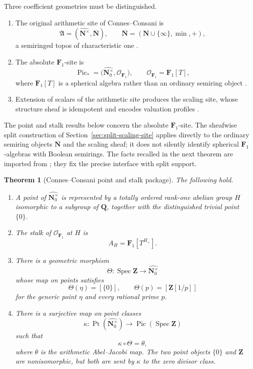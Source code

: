 \documentclass[11pt]{amsart}
\numberwithin{equation}{section}
\newtheorem{theorem}{Theorem}[section]
\theoremstyle{definition}
\newcommand{\Z}{\mathbf Z}
\newcommand{\Q}{\mathbf Q}
\newcommand{\N}{\mathbf N}
\newcommand{\Fone}{\mathbf F_1}
\newcommand{\Spec}{\operatorname{Spec}}
\newcommand{\cO}{\mathcal O}
\newcommand{\Nbar}{\overline{\N}}
\begin{document}
Three coefficient geometries must be distinguished.
\begin{enumerate}[label=\textup{(\roman*)}]
\item The original arithmetic site of Connes--Consani is
\[
\mathfrak A=(\widehat{\N^\times},\Nbar),
\qquad
\Nbar=(\N\cup\{\infty\},\min,+),
\]
a semiringed topos of characteristic one \cite{CCArithmeticSite}.
\item The absolute $\Fone$-site is
\[
\operatorname{Pic}_*
 =\bigl(\widehat{\N_0^\times},\cO_{\Fone}\bigr),
\qquad
\cO_{\Fone}=\Fone[T],
\]
where $\Fone[T]$ is a spherical algebra rather than an ordinary semiring
object \cite{CCAbsolute}.
\item Extension of scalars of the arithmetic site produces the scaling
site, whose structure sheaf is idempotent and encodes valuation profiles
\cite{CCScalingSite}.
\end{enumerate}
The point and stalk results below concern the absolute $\Fone$-site.  The
sheafwise split construction of Section~\ref{sec:split-scaling-site}
applies directly to the ordinary semiring objects $\Nbar$ and the scaling
sheaf; it does not silently identify spherical $\Fone$-algebras with
Boolean semirings.  The facts recalled in the next theorem are imported
from \cite{CCAbsolute,CCArithmeticSite}; they fix the precise interface
with split support.

\begin{theorem}[Connes--Consani point and stalk package]
\label{thm:cc-package}
The following hold.
\begin{enumerate}[label=\textup{(\roman*)}]
\item A point of $\widehat{\N_0^\times}$ is represented by a totally ordered
rank-one abelian group $H$ isomorphic to a subgroup of $\Q$, together with
the distinguished trivial point $\{0\}$.
\item The stalk of $\cO_{\Fone}$ at $H$ is
\[
A_H=\Fone[T^{H_+}].
\]
\item There is a geometric morphism
\[
\Theta:\Spec\Z\longrightarrow\widehat{\N_0^\times}
\]
whose map on points satisfies
\[
\Theta(\eta)=[\{0\}],
\qquad
\Theta(p)=[\Z[1/p]]
\]
for the generic point $\eta$ and every rational prime $p$.
\item There is a surjective map on point classes
\[
\kappa:\operatorname{Pt}(\widehat{\N_0^\times})
\longrightarrow \operatorname{Pic}(\Spec\Z)
\]
such that
\[
\kappa\circ\Theta=\theta,
\]
where $\theta$ is the arithmetic Abel--Jacobi map.  The two point objects
$\{0\}$ and $\Z$ are nonisomorphic, but both are sent by $\kappa$ to the
zero divisor class.
\end{enumerate}
\end{theorem}
\end{document}
